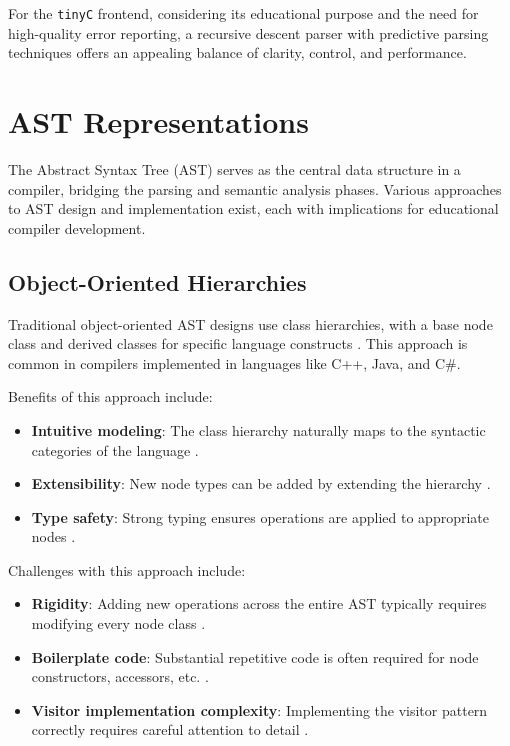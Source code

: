 For the \texttt{tinyC} frontend, considering its educational purpose and the need for high-quality error reporting, a recursive descent parser with predictive parsing techniques offers an appealing balance of clarity, control, and performance.

\section{AST Representations}

The Abstract Syntax Tree (AST) serves as the central data structure in a compiler, bridging the parsing and semantic analysis phases. Various approaches to AST design and implementation exist, each with implications for educational compiler development.

\subsection{Object-Oriented Hierarchies}

Traditional object-oriented AST designs use class hierarchies, with a base node class and derived classes for specific language constructs \cite{gamma1995design}. This approach is common in compilers implemented in languages like C++, Java, and C\#.

Benefits of this approach include:
\begin{itemize}
    \item \textbf{Intuitive modeling}: The class hierarchy naturally maps to the syntactic categories of the language \cite{appel2004modern}.
    \item \textbf{Extensibility}: New node types can be added by extending the hierarchy \cite{gamma1995design}.
    \item \textbf{Type safety}: Strong typing ensures operations are applied to appropriate nodes \cite{odersky2004overview}.
\end{itemize}

Challenges with this approach include:
\begin{itemize}
    \item \textbf{Rigidity}: Adding new operations across the entire AST typically requires modifying every node class \cite{gamma1995design}.
    \item \textbf{Boilerplate code}: Substantial repetitive code is often required for node constructors, accessors, etc. \cite{appel2004modern}.
    \item \textbf{Visitor implementation complexity}: Implementing the visitor pattern correctly requires careful attention to detail \cite{gamma1995design}.
\end{itemize}

